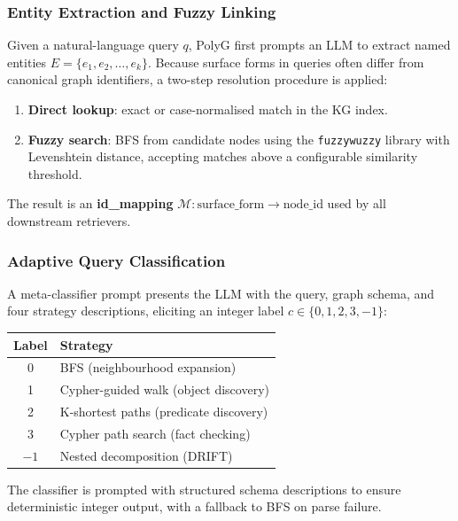 \documentclass[12pt,a4paper]{article}
\begin{document}
\subsubsection{Entity Extraction and Fuzzy Linking}

Given a natural-language query $q$, PolyG first prompts an LLM to extract
named entities $E = \{e_1, e_2, \ldots, e_k\}$. Because surface forms in
queries often differ from canonical graph identifiers, a two-step resolution
procedure is applied:

\begin{enumerate}
  \item \textbf{Direct lookup}: exact or case-normalised match in the KG index.
  \item \textbf{Fuzzy search}: BFS from candidate nodes using the
    \texttt{fuzzywuzzy} library with Levenshtein distance, accepting matches
    above a configurable similarity threshold.
\end{enumerate}

The result is an \textbf{id\_mapping} $\mathcal{M}: \text{surface\_form}
\rightarrow \text{node\_id}$ used by all downstream retrievers.

\subsubsection{Adaptive Query Classification}

A meta-classifier prompt presents the LLM with the query, graph schema, and
four strategy descriptions, eliciting an integer label $c \in \{0, 1, 2, 3, -1\}$:

\begin{center}
\begin{tabular}{cl}
\toprule
\textbf{Label} & \textbf{Strategy} \\
\midrule
0 & BFS (neighbourhood expansion) \\
1 & Cypher-guided walk (object discovery) \\
2 & K-shortest paths (predicate discovery) \\
3 & Cypher path search (fact checking) \\
$-1$ & Nested decomposition (DRIFT) \\
\bottomrule
\end{tabular}
\end{center}

The classifier is prompted with structured schema descriptions to ensure
deterministic integer output, with a fallback to BFS on parse failure.
\end{document}
